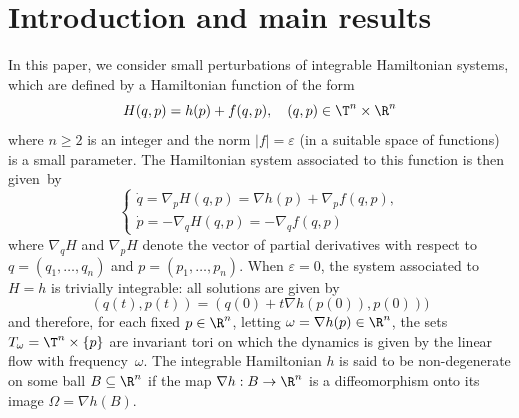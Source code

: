 \Changel
\section{Introduction and main results}\label{s1}

In this paper, we consider small perturbations of integrable Hamiltonian systems, which are defined by a Hamiltonian function of the form
\[ H(q,p)=h(p)+f(q,p), \quad (q,p) \in \T^{n} \times \R^n \]
where $n\geq 2$ is an integer and the norm $|f|=\varepsilon$ (in a suitable space of functions) is a small parameter. The Hamiltonian system associated to this function is then given~by
\begin{equation*}
\begin{cases}
\dot{q}=\nabla_p H(q,p)=\nabla h (p)+ \nabla_p f(q,p),\\
\dot{p}=-\nabla_q H(q,p)=-\nabla_q f(q,p)
\end{cases}
\end{equation*}
where $\nabla_q H$ and $\nabla_p H$ denote the vector of partial derivatives with respect to $q=(q_1,\dots,q_n)$ and $p=(p_1,\dots,p_n)$. When $\varepsilon=0$, the system associated to $H=h$ is trivially integrable: all solutions are given by
\[ (q(t),p(t))=(q(0)+t \nabla h (p(0)),p(0))) \]
and therefore, for each fixed $p \in \R^n$, letting $\omega=\nabla h(p) \in \R^n$, the sets $T_{\omega}=\T^n \times \{p\}$ are invariant tori on which the dynamics is given by the linear flow with frequency~$\omega$. The integrable Hamiltonian $h$ is said to be non-degenerate on some ball $B \subseteq \R^n$ if the map $\nabla h : B \to \R^n$ is a diffeomorphism onto its image $\Omega=\nabla h(B)$.

